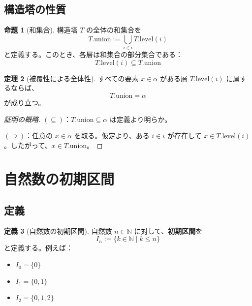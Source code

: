 \documentclass[a4paper,12pt]{ltjsarticle}
\theoremstyle{definition}
\newtheorem{theorem}{定理}[section]
\newtheorem{proposition}[theorem]{命題}
\newtheorem{definition}[theorem]{定義}
\newcommand{\N}{\mathbb{N}}
\begin{document}
\subsection{構造塔の性質}

\begin{proposition}[和集合]\label{prop:union}
構造塔 $T$ の全体の和集合を
\[
T.\mathrm{union} := \bigcup_{i \in \iota} T.\mathrm{level}(i)
\]
と定義する。このとき、各層は和集合の部分集合である：
\[
T.\mathrm{level}(i) \subseteq T.\mathrm{union}
\]
\end{proposition}

\begin{theorem}[被覆性による全体性]\label{thm:covering}
すべての要素 $x \in \alpha$ がある層 $T.\mathrm{level}(i)$ に属するならば、
\[
T.\mathrm{union} = \alpha
\]
が成り立つ。
\end{theorem}

\begin{proof}[証明の概略]
\textbf{$(\subseteq)$}：$T.\mathrm{union} \subseteq \alpha$ は定義より明らか。

\textbf{$(\supseteq)$}：任意の $x \in \alpha$ を取る。仮定より、ある $i \in \iota$ が存在して $x \in T.\mathrm{level}(i)$。したがって、$x \in T.\mathrm{union}$。
\end{proof}

\begin{center}
\end{center}

\section{自然数の初期区間}

\subsection{定義}

\begin{definition}[自然数の初期区間]\label{def:nat_initial}
自然数 $n \in \N$ に対して、\textbf{初期区間}を
\[
I_n := \{k \in \N \mid k \leq n\}
\]
と定義する。例えば：
\begin{itemize}
\item $I_0 = \{0\}$
\item $I_1 = \{0, 1\}$
\item $I_2 = \{0, 1, 2\}$
\end{itemize}
\end{definition}
\end{document}
